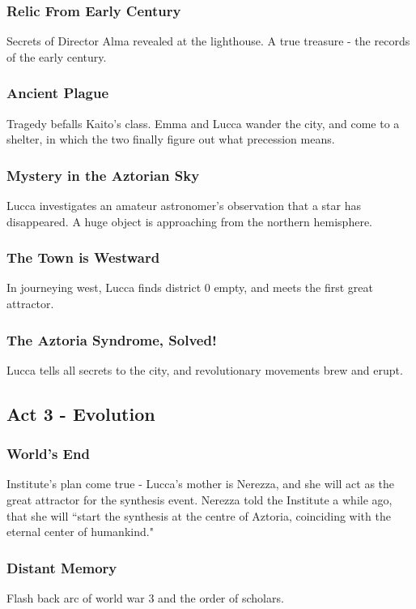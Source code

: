 \documentclass[11pt]{article}
\begin{document}
		\subsubsection{Relic From Early Century}
		Secrets of Director Alma revealed at the lighthouse.
		A true treasure - the records of the early century.
		\subsubsection{Ancient Plague}
		Tragedy befalls Kaito's class.
		Emma and Lucca wander the city, and come to a shelter, in which the two finally figure out what precession means.
		\subsubsection{Mystery in the Aztorian Sky}
		Lucca investigates an amateur astronomer's observation that a star has disappeared.
		A huge object is approaching from the northern hemisphere.
		\subsubsection{The Town is Westward}
		In journeying west, Lucca finds district 0 empty, and meets the first great attractor.
		\subsubsection{The Aztoria Syndrome, Solved!}
		Lucca tells all secrets to the city, and revolutionary movements brew and erupt.





	\subsection{Act 3 - Evolution}
		\subsubsection{World's End}
		Institute's plan come true - Lucca's mother is Nerezza, and she will act as the great attractor for the synthesis event.
		Nerezza told the Institute a while ago, that she will ``start the synthesis at the centre of Aztoria, coinciding with the eternal center of humankind."
		\subsubsection{Distant Memory}
		Flash back arc of world war 3 and the order of scholars.
\end{document}

